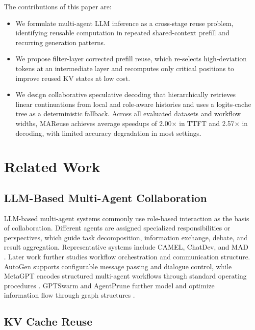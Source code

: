 \documentclass[letterpaper]{article} %
\begin{document}
The contributions of this paper are:
\begin{itemize}
    \item We formulate multi-agent LLM inference as a cross-stage reuse problem, identifying reusable computation in repeated shared-context prefill and recurring generation patterns.
    \item We propose filter-layer corrected prefill reuse, which re-selects high-deviation tokens at an intermediate layer and recomputes only critical positions to improve reused KV states at low cost.
    \item We design collaborative speculative decoding that hierarchically retrieves linear continuations from local and role-aware histories and uses a logits-cache tree as a deterministic fallback. Across all evaluated datasets and workflow widths, MAReuse achieves average speedups of 2.00$\times$ in TTFT and 2.57$\times$ in decoding, with limited accuracy degradation in most settings.
\end{itemize}

\section{Related Work}

\subsection{LLM-Based Multi-Agent Collaboration}

LLM-based multi-agent systems commonly use role-based interaction as the basis of collaboration. Different agents are assigned specialized responsibilities or perspectives, which guide task decomposition, information exchange, debate, and result aggregation. Representative systems include CAMEL, ChatDev, and MAD \citep{li2023camel, qian2024chatdev, liang2024encouraging}. Later work further studies workflow orchestration and communication structure. AutoGen supports configurable message passing and dialogue control, while MetaGPT encodes structured multi-agent workflows through standard operating procedures \citep{wu2023autogen, hong2024metagpt}. GPTSwarm and AgentPrune further model and optimize information flow through graph structures \citep{zhuge2024gptswarm, zhang2025agentprune}.

\subsection{KV Cache Reuse}
\end{document}
